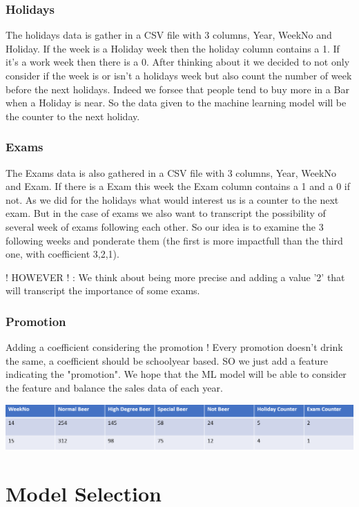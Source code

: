 \documentclass{report}
\begin{document}
\subsection{Holidays}

The holidays data is gather in a CSV file with 3 columns, Year, WeekNo and Holiday. If the week is a Holiday week then the holiday column contains a 1. If it's a work week then there is a 0. After thinking about it we decided to not only consider if the week is or isn't a holidays week but also count the number of week before the next holidays. Indeed we forsee that people tend to buy more in a Bar when a Holiday is near.
So the data given to the machine learning model will be the counter to the next holiday.

\subsection{Exams}

The Exams data is also gathered in a CSV file with 3 columns, Year, WeekNo and Exam. If there is a Exam this week the Exam column contains a 1 and a 0 if not. As we did for the holidays what would interest us is a counter to the next exam. But in the case of exams we also want to transcript the possibility of several week of exams following each other. So our idea is to examine the 3 following weeks and ponderate them (the first is more impactfull than the third one, with coefficient 3,2,1).


! HOWEVER ! : We think about being more precise and adding a value '2' that will transcript the importance of some exams.

\subsection{Promotion}


Adding a coefficient considering the promotion ! Every promotion doesn't drink the same, a coefficient should be schoolyear based. SO we just add a feature indicating the "promotion". We hope that the ML model will be able to consider the feature and balance the sales data of each year.


\includegraphics[scale=0.7]{DataModel}
\chapter{Model Selection}
\end{document}
